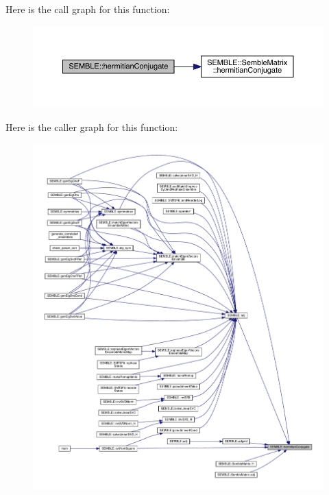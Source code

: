 Here is the call graph for this function\+:
\nopagebreak
\begin{figure}[H]
\begin{center}
\leavevmode
\includegraphics[width=350pt]{d7/dfd/namespaceSEMBLE_a053770bae7a7361192307920b447233d_cgraph}
\end{center}
\end{figure}
Here is the caller graph for this function\+:
\nopagebreak
\begin{figure}[H]
\begin{center}
\leavevmode
\includegraphics[width=350pt]{d7/dfd/namespaceSEMBLE_a053770bae7a7361192307920b447233d_icgraph}
\end{center}
\end{figure}
\mbox{\label{namespaceSEMBLE_aa305667d8c31ec6afd5718f50be47c22}} 
